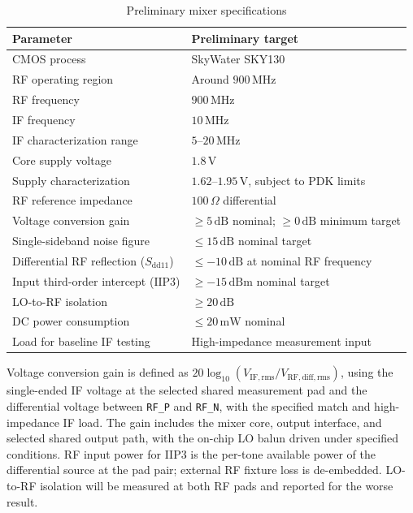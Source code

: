 \begin{table}[htbp]
\centering
\caption{Preliminary mixer specifications}
\label{tab:specifications}
\begin{tabularx}{\textwidth}{@{}p{}Y@{}}
\toprule
\textbf{Parameter} & \textbf{Preliminary target} \\
\midrule

CMOS process &
SkyWater SKY130 \\

RF operating region &
Around \(900\,\mathrm{MHz}\) \\

RF frequency &
\(900\,\mathrm{MHz}\) \\

IF frequency &
\(10\,\mathrm{MHz}\) \\

IF characterization range &
\(5\)--\(20\,\mathrm{MHz}\) \\

Core supply voltage &
\(1.8\,\mathrm{V}\) \\

Supply characterization &
\(1.62\)--\(1.95\,\mathrm{V}\),
subject to PDK limits \\

RF reference impedance &
\(100\,\Omega\) differential \\

Voltage conversion gain &
\(\geq 5\,\mathrm{dB}\) nominal;
\(\geq 0\,\mathrm{dB}\) minimum target \\

Single-sideband noise figure &
\(\leq 15\,\mathrm{dB}\) nominal target \\

Differential RF reflection (\(S_{\mathrm{dd}11}\)) &
\(\leq -10\,\mathrm{dB}\)
at nominal RF frequency \\

Input third-order intercept (\(\mathrm{IIP3}\)) &
\(\geq -15\,\mathrm{dBm}\) nominal target \\

LO-to-RF isolation &
\(\geq 20\,\mathrm{dB}\) \\

DC power consumption &
\(\leq 20\,\mathrm{mW}\) nominal \\

Load for baseline IF testing &
High-impedance measurement input \\

\bottomrule
\end{tabularx}
\end{table}

Voltage conversion gain is defined as \(20\log_{10}(V_{\mathrm{IF,rms}}/V_{\mathrm{RF,diff,rms}})\), using the single-ended IF voltage at the selected shared measurement pad and the differential voltage between \texttt{RF\_P} and \texttt{RF\_N}, with the specified match and high-impedance IF load.
The gain includes the mixer core, output interface, and selected shared output path, with the on-chip LO balun driven under specified conditions.
RF input power for IIP3 is the per-tone available power of the differential source at the pad pair; external RF fixture loss is de-embedded.
LO-to-RF isolation will be measured at both RF pads and reported for the worse result.
